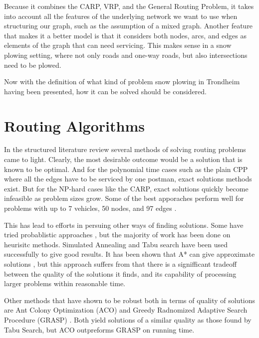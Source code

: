 Because it combines the CARP, VRP, and the General Routing Problem, it takes into account all the features of the underlying network we want to use when structuring our graph, such as the assumption of a mixed graph. Another feature that makes it a better model is that it considers both nodes, arcs, and edges as elements of the graph that can need servicing. This makes sense in a snow plowing setting, where not only roads and one-way roads, but also intersections need to be plowed.

Now with the definition of what kind of problem snow plowing in Trondheim having been presented, how it can be solved should be considered.




\section{Routing Algorithms} %
\label{sec:routing_algorithms}

In the structured literature review several methods of solving routing problems came to light. Clearly, the most desirable outcome would be a solution that is known to be optimal. And for the polynomial time cases such as the plain CPP where all the edges have to be serviced by one postman, exact solutions methods exist. But for the NP-hard cases like the CARP, exact solutions quickly become infeasible as problem sizes grow. Some of the best apporaches perform well for problems with up to 7 vehicles, 50 nodes, and 97 edges \citep{belenguer2003cutting}.

This has lead to efforts in persuing other ways of finding solutions. Some have tried probablistic approaches \citep{christiansen2009branch}, but the majority of work has been done on heurisitc methods. Simulated Annealing \citep{eglese1994simulatedAnnealing} and Tabu search \citep{brandao2008tabu} have been used successfully to give good results. It has been shown that A* can give approximate solutions \citep{rao2011AStar}, but this approach suffers from that there is a signifficant tradeoff between the quality of the solutions it finds, and its capability of processing larger problems within reasonable time.

Other methods that have shown to be robust both in terms of quality of solutions are Ant Colony Optimization (ACO) \citep{santos2010ACO} and Greedy Radnomized Adaptive Search Procedure (GRASP) \citep{usberti2013grasp}. Both yield solutions of a similar quality as those found by Tabu Search, but ACO outpreforms GRASP on running time.

